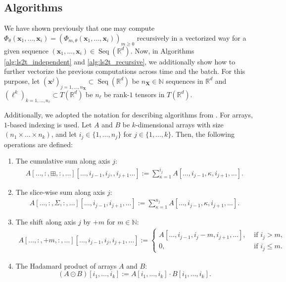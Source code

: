 \documentclass{article} \usepackage{iclr2021_conference,times}
\newcommand{\R}{\mathbb{R}}
\newcommand{\bx}{\mathbf{x}}
\newcommand{\bX}{\mathbf{X}}
\newcommand{\NN}{\mathbb{N}}
\newcommand{\Seq}[1]{\operatorname{Seq}(#1)}
\theoremstyle{plain}
\theoremstyle{definition}
\begin{document}
\subsection{Algorithms} \label{app:algs}

We have shown previously that one may compute $\Phi_\theta(\bx_1, \dots, \bx_i) = (\Phi_{m, \theta}(\bx_1, \dots, \bx_i))_{m \geq 0}$ recursively in a vectorized way for a given sequence $(\bx_1, \dots, \bx_i) \in \Seq{\R^d}$. Now, in Algorithms \ref{alg:ls2t_independent} and \ref{alg:ls2t_recursive}, we additionally show how to further vectorize the previous computations across time and the batch. For this purpose, let $(\bx^j)_{j=1, \dots, n_\bX} \subset \Seq{\R^d}$ be $n_\bX \in \NN$ sequences in $\R^d$ and $(\ell^k)_{k=1,\dots, n_\ell} \subset T(\R^d)$ be $n_\ell$ be rank-$1$ tensors in $T(\R^d)$.

Additionally, we adopted the notation for describing algorithms from \citet{kiraly2016kernels}. For arrays, $1$-based indexing is used. Let $A$ and $B$ be $k$-dimensional arrays with size $(n_1 \times \dots \times n_k)$, and let $i_j \in \{1, \dots, n_j\}$ for $j \in \{1, \dots, k\}$. Then, the following operations are defined:
  \begin{enumerate}[label=(\roman*)]
  	\item  The cumulative sum along axis $j$:
  	\begin{align*}
  		A[\dots, :, \boxplus, :, \dots][\dots, i_{j-1}, i_j,, i_{j+1} \dots] := \sum_{\kappa=1}^{i_j} A[\dots, i_{j-1}, \kappa, i_{j+1}, \dots].
  	\end{align*}
  	\item The slice-wise sum along axis $j$:
  	\begin{align*}
	  	A[\dots, :, \Sigma, :, \dots][\dots, i_{j-1}, i_{j+1}, \dots] := \sum_{\kappa=1}^{n_j} A[\dots, i_{j-1}, \kappa, i_{j+1}, \dots].
  	\end{align*}
  	\item The shift along axis $j$ by $+m$ for $m \in \NN$:
  	\begin{align*}
	  	A[\dots, :, +m, :, \dots][\dots, i_{j-1}, i_j, i_{j+1}, \dots] := \left\lbrace\begin{array}{ll} A[\dots, i_{j-1}, i_j-m, i_{j+1}, \dots], & \text{ if } i_j > m, \\ 0, & \text{ if } i_j \leq m.  \end{array}\right.
  	\end{align*}
  	\item The Hadamard product of arrays $A$ and $B$:
  	\[(A \odot B) [i_1, \dots, i_k] := A[i_1, \dots, i_k] \cdot B[i_1, \dots, i_k]. \] 
  \end{enumerate}
 
\end{document}
